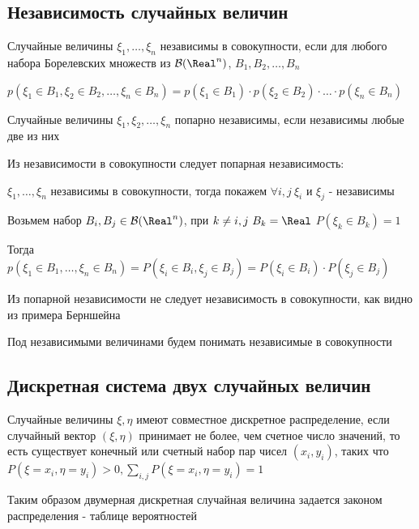 \documentclass[12pt]{article}
\begin{document}
    \hypertarget{randomvariablesindependence}{}

    \subsection{Независимость случайных величин}

    \Def Случайные величины $\xi_1, \dots, \xi_n$ независимы в совокупности, если для любого набора Борелевских множеств из
    $\mathcal{B}(\Real^n)$, $B_1, B_2, \dots, B_n$

    $p(\xi_1 \in B_1, \xi_2 \in B_2, \dots, \xi_n \in B_n) = p(\xi_1 \in B_1) \cdot p(\xi_2 \in B_2) \cdot \dots \cdot p(\xi_n \in B_n)$

    \Def Случайные величины $\xi_1, \xi_2, \dots, \xi_n$ попарно независимы, если независимы любые две из них

    \Notas Из независимости в совокупности следует попарная независимость: 

    $\xi_1, \dots, \xi_n$ независимы в совокупности, тогда покажем $\forall i, j \ \xi_i$ и $\xi_j$ - независимы

    Возьмем набор $B_i, B_j \in \mathcal{B}(\Real^n)$, при $k \neq i, j \ B_k = \Real$ \hfill $P(\xi_k \in B_k) = 1$

    Тогда $p(\xi_1 \in B_1, \dots, \xi_n \in B_n) = P(\xi_i \in B_i, \xi_j \in B_j) = P(\xi_i \in B_i) \cdot P(\xi_j \in B_j)$

    \Nota Из попарной независимости не следует независимость в совокупности, как видно из примера Берншейна

    Под независимыми величинами будем понимать независимые в совокупности

    \hypertarget{discretesystemoftwovariables}{}

    \subsection{Дискретная система двух случайных величин}

    \Def Случайные величины $\xi, \eta$ имеют совместное дискретное распределение, если случайный вектор $(\xi, \eta)$
    принимает не более, чем счетное число значений, то есть существует конечный или счетный набор пар чисел $(x_i, y_i)$, 
    таких что $P(\xi = x_i, \eta = y_i) > 0, \sum_{i, j} P(\xi = x_i, \eta = y_i) = 1$

    Таким образом двумерная дискретная случайная величина задается законом распределения - таблице вероятностей
\end{document}
